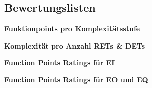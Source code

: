\subsection{Bewertungslisten}

\begin{minipage}{8cm}
	\textbf{Funktionpoints pro Komplexitätsstufe}
\end{minipage}
\begin{minipage}{7cm}
	\textbf{Komplexität pro Anzahl RETs \& DETs}
\end{minipage}

\begin{figure}[hb]
	\centering
\end{figure}

\begin{minipage}{8cm}
	\textbf{Function Points Ratings für EI}
\end{minipage}
\begin{minipage}{7cm}
	\textbf{Function Points Ratings für EO und EQ}
\end{minipage}

\begin{figure}[hb]
	\centering
\end{figure}


